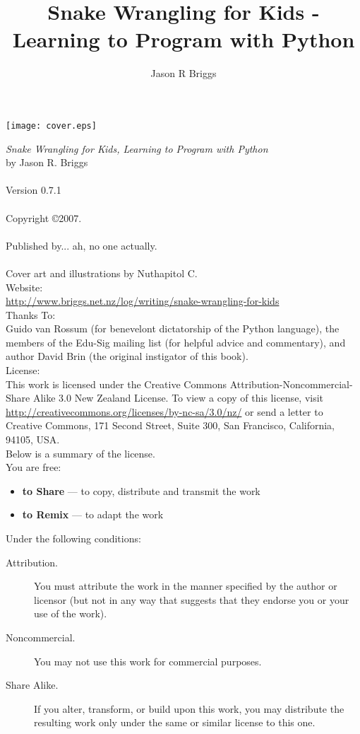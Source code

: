 \documentclass[12pt,leqno]{book}
\title{Snake Wrangling for Kids - Learning to Program with Python}
\author{Jason R Briggs}
\begin{document}
\pagestyle{empty}
\frontmatter
\begin{titlepage}
\addtolength{\evensidemargin}{-2cm}
\addtolength{\oddsidemargin}{-2cm}
\texttt{[image: cover.eps]} 
\end{titlepage}

\noindent
\textsf{\emph{Snake Wrangling for Kids, Learning to Program with Python}}\\
by Jason R. Briggs\\
\\
Version 0.7.1
\\\\
Copyright \copyright 2007.\\
\\
Published by... ah, no one actually.\\
\\
Cover art and illustrations by Nuthapitol C.\\
\linebreak 
\noindent
Website:\\ \href{http://www.briggs.net.nz/log/writing/snake-wrangling-for-kids}{http://www.briggs.net.nz/log/writing/snake-wrangling-for-kids}\\ 

\noindent
Thanks To:\\
Guido van Rossum (for benevelont dictatorship of the Python language), the members of the Edu-Sig mailing list (for helpful advice and commentary), and author David Brin (the original instigator of this book).\\

\noindent
License:\\
This work is licensed under the Creative Commons Attribution-Noncommercial-Share Alike 3.0 New Zealand License. To view a copy of this license, visit\\ \href{http://creativecommons.org/licenses/by-nc-sa/3.0/nz/}{http://creativecommons.org/licenses/by-nc-sa/3.0/nz/} or send a letter to Creative Commons, 171 Second Street, Suite 300, San Francisco, California, 94105, USA.\\

\noindent
Below is a summary of the license.\\

\noindent
You are free:
\begin{itemize}
 \item \textbf{to Share} — to copy, distribute and transmit the work 
 \item \textbf{to Remix} — to adapt the work
\end{itemize}
\noindent
Under the following conditions:
\begin{description}
 \item[Attribution.] You must attribute the work in the manner specified by the author or licensor (but not in any way that suggests that they endorse you or your use of the work).
 \item[Noncommercial.] You may not use this work for commercial purposes.
 \item[Share Alike.] If you alter, transform, or build upon this work, you may distribute the resulting work only under the same or similar license to this one.
\end{description}
\end{document}
